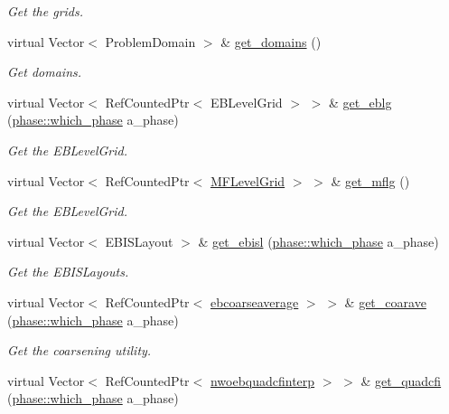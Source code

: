 \begin{DoxyCompactItemize}
\begin{DoxyCompactList}\small\item\em Get the grids. \end{DoxyCompactList}\item 
virtual Vector$<$ Problem\+Domain $>$ \& \hyperlink{classamr__mesh_adf05eb335a8959ff2ebedaf6239fc9fa}{get\+\_\+domains} ()
\begin{DoxyCompactList}\small\item\em Get domains. \end{DoxyCompactList}\item 
virtual Vector$<$ Ref\+Counted\+Ptr$<$ E\+B\+Level\+Grid $>$ $>$ \& \hyperlink{classamr__mesh_a94902fd9372a5e5479d170883e634811}{get\+\_\+eblg} (\hyperlink{namespacephase_a23c76f548a5eb1955ed8c929c541108b}{phase\+::which\+\_\+phase} a\+\_\+phase)
\begin{DoxyCompactList}\small\item\em Get the E\+B\+Level\+Grid. \end{DoxyCompactList}\item 
virtual Vector$<$ Ref\+Counted\+Ptr$<$ \hyperlink{classMFLevelGrid}{M\+F\+Level\+Grid} $>$ $>$ \& \hyperlink{classamr__mesh_a1b6d80c1870ff5304651a17e4005f251}{get\+\_\+mflg} ()
\begin{DoxyCompactList}\small\item\em Get the E\+B\+Level\+Grid. \end{DoxyCompactList}\item 
virtual Vector$<$ E\+B\+I\+S\+Layout $>$ \& \hyperlink{classamr__mesh_aa70f0c8d2f7c8b993b11e40f40efe127}{get\+\_\+ebisl} (\hyperlink{namespacephase_a23c76f548a5eb1955ed8c929c541108b}{phase\+::which\+\_\+phase} a\+\_\+phase)
\begin{DoxyCompactList}\small\item\em Get the E\+B\+I\+S\+Layouts. \end{DoxyCompactList}\item 
virtual Vector$<$ Ref\+Counted\+Ptr$<$ \hyperlink{classebcoarseaverage}{ebcoarseaverage} $>$ $>$ \& \hyperlink{classamr__mesh_ad2a556d219b73ae979e0cbe73ba452ef}{get\+\_\+coarave} (\hyperlink{namespacephase_a23c76f548a5eb1955ed8c929c541108b}{phase\+::which\+\_\+phase} a\+\_\+phase)
\begin{DoxyCompactList}\small\item\em Get the coarsening utility. \end{DoxyCompactList}\item 
virtual Vector$<$ Ref\+Counted\+Ptr$<$ \hyperlink{classnwoebquadcfinterp}{nwoebquadcfinterp} $>$ $>$ \& \hyperlink{classamr__mesh_af998d5194454a54f17e5c2eeee20d599}{get\+\_\+quadcfi} (\hyperlink{namespacephase_a23c76f548a5eb1955ed8c929c541108b}{phase\+::which\+\_\+phase} a\+\_\+phase)

\end{DoxyCompactItemize}
